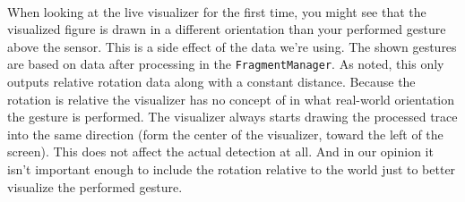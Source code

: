 \documentclass{standalone}
\begin{document}
  \paragraph{}
  When looking at the live visualizer for the first time, you might see that the
  visualized figure is drawn in a different orientation than your performed
  gesture above the sensor. This is a side effect of the data we're using. The
  shown gestures are based on data after processing in the
  \verb_FragmentManager_. As noted, this only outputs relative rotation data
  along with a constant distance. Because the rotation is relative the
  visualizer has no concept of in what real-world orientation the gesture is
  performed. The visualizer always starts drawing the processed trace into the
  same direction (form the center of the visualizer, toward the left of the
  screen). This does not affect the actual detection at all. And in our opinion
  it isn't important enough to include the rotation relative to the world just
  to better visualize the performed gesture.

  \clearpage
\end{document}
